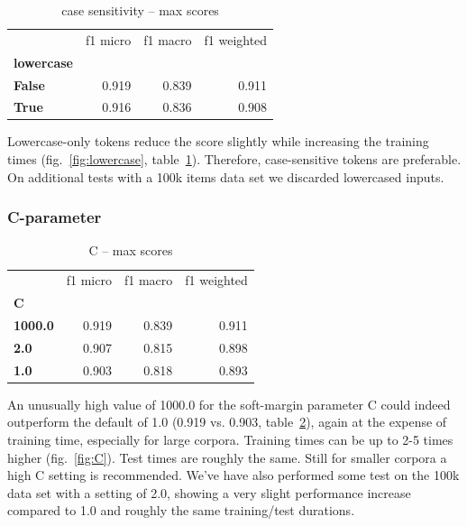\documentclass[11pt,a4paper]{article}
\begin{document}
\begin{table}[htbp]
	\caption{case sensitivity -- max scores}
	\label{tab:lowercase}
	\centering
	\begin{tabular}{lrrr}
	\toprule
		{} &  f1 micro &  f1 macro &  f1 weighted \\
		\textbf{lowercase} &           &           & \\
		\midrule
		\textbf{False} &  0.919 &  0.839 &     0.911 \\
		\textbf{True} &  0.916 &  0.836 &     0.908 \\
		\bottomrule
	\end{tabular}
\end{table}

Lowercase-only tokens reduce the score slightly while increasing the training times (fig.~\ref{fig:lowercase}, table~\ref{tab:lowercase}). Therefore, case-sensitive tokens are preferable. On additional tests with a 100k items data set we discarded lowercased inputs.

\subsubsection{C-parameter}


\begin{table}[htbp]
	\caption{C -- max scores}
	\label{tab:C}
	\centering
	\begin{tabular}{lrrr}
	\toprule
		{} &  f1 micro &  f1 macro &  f1 weighted \\
		\textbf{C} &           &           & \\
		\midrule
		\textbf{1000.0} & 0.919   & 0.839  &    0.911  \\
		\textbf{2.0}    & 0.907   & 0.815  &    0.898  \\
		\textbf{1.0}    & 0.903   & 0.818  &    0.893  \\
		\bottomrule
	\end{tabular}
\end{table}

An unusually high value of 1000.0 for the soft-margin parameter C could indeed outperform the default of 1.0 (0.919 vs. 0.903, table~\ref{tab:C}), again at the expense of training time, especially for large corpora. Training times can be up to 2-5 times higher (fig.~\ref{fig:C}). Test times are roughly the same. Still for smaller corpora a high C setting is recommended.
We've have also performed some test on the 100k data set with a setting of 2.0, showing a very slight performance increase compared to 1.0 and roughly the same training/test durations.
\end{document}
